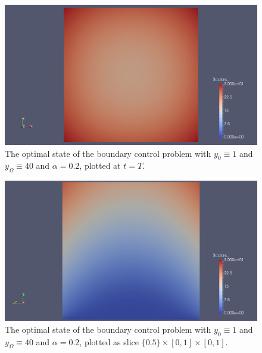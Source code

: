 \documentclass[../thesis.tex]{subfiles}
\begin{document}
\begin{figure}[htpb]
\centering
\includegraphics[width=\textwidth]{Images/boundary-lowthet-y-endtime.png}
\caption{The optimal state of the boundary control problem with $y_0 \equiv 1$ and $y_\Omega \equiv 40$ and $\alpha = 0.2$, plotted at $t = T$.}
\label{fig:boundary-lowthet-y-endtime}
\end{figure}
\begin{figure}[htpb]
\centering
\includegraphics[width=\textwidth]{Images/boundary-lowthet-y-cut.png}
\caption{The optimal state of the boundary control problem with $y_0 \equiv 1$ and $y_\Omega \equiv 40$ and $\alpha = 0.2$, plotted as slice $\{ 0.5 \} \times [0, 1] \times [0, 1]$.}
\label{fig:boundary-lowthet-y-cut}
\end{figure}
\FloatBarrier
\end{document}
